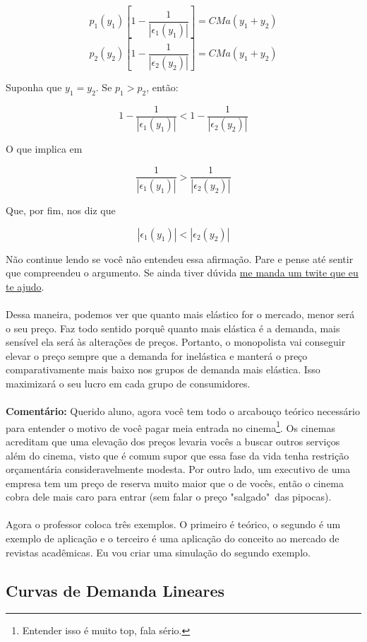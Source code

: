 \documentclass[a4paper,11pt,oneside]{book}
\theoremstyle{definition}
\theoremstyle{break}
\begin{document}
$$ p_1(y_1) \left[1 - \frac{1}{|\epsilon_1(y_1)|} \right] = CMa(y_1 + y_2) $$
$$ p_2(y_2) \left[1 - \frac{1}{|\epsilon_2(y_2)|} \right] = CMa(y_1 + y_2) $$

Suponha que $y_1 = y_2$. Se $p_1 > p_2$, então:

$$ 1 - \frac{1}{|\epsilon_1(y_1)|} < 1 - \frac{1}{|\epsilon_2(y_2)|} $$

O que implica em

$$ \frac{1}{|\epsilon_1(y_1)|} > \frac{1}{|\epsilon_2(y_2)|} $$

Que, por fim, nos diz que

$$ |\epsilon_1(y_1)| < |\epsilon_2(y_2)| $$

Não continue lendo se você não entendeu essa afirmação. Pare e pense até sentir que compreendeu o argumento. Se ainda tiver dúvida \href{https://twitter.com/bruno_ruas2}{me manda um twite que eu te ajudo}.
\\~\\
Dessa maneira, podemos ver que quanto mais elástico for o mercado, menor será o seu preço. Faz todo sentido porquê quanto mais elástica é a demanda, mais sensível ela será às alterações de preços. Portanto, o monopolista vai conseguir elevar o preço sempre que a demanda for inelástica e manterá o preço comparativamente mais baixo nos grupos de demanda mais elástica. Isso maximizará o seu lucro em cada grupo de consumidores.
\\~\\
\textbf{Comentário:} Querido aluno, agora você tem todo o arcabouço teórico necessário para entender o motivo de você pagar meia entrada no cinema\footnote{Entender isso é muito top, fala sério.}. Os cinemas acreditam que uma elevação dos preços levaria vocês a buscar outros serviços além do cinema, visto que é comum supor que essa fase da vida tenha restrição orçamentária consideravelmente modesta. Por outro lado, um executivo de uma empresa tem um preço de reserva muito maior que o de vocês, então o cinema cobra dele mais caro para entrar (sem falar o preço "salgado"\ das pipocas).
\\~\\
Agora o professor coloca três exemplos. O primeiro é teórico, o segundo é um exemplo de aplicação e o terceiro é uma aplicação do conceito ao mercado de revistas acadêmicas. Eu vou criar uma simulação do segundo exemplo.

\subsection{Curvas de Demanda Lineares}
\end{document}
